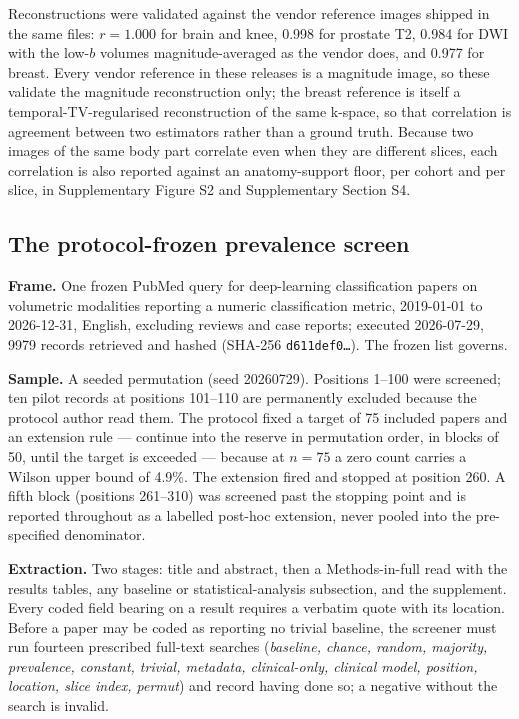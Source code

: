 \documentclass[11pt,a4paper]{article}
\begin{document}
Reconstructions were validated against the
vendor reference images shipped in the same files: $r=1.000$ for brain and knee,
0.998 for prostate T2, 0.984 for DWI with the low-$b$ volumes magnitude-averaged
as the vendor does, and 0.977 for breast. Every vendor reference in these
releases is a magnitude image, so these validate the magnitude reconstruction
only; the breast reference is itself a temporal-TV-regularised reconstruction of
the same k-space, so that correlation is agreement between two estimators rather
than a ground truth. Because two images of the same body part correlate even when
they are different slices, each correlation is also reported against an
anatomy-support floor, per cohort and per slice, in Supplementary Figure S2 and
Supplementary Section S4.

\subsection{The protocol-frozen prevalence screen}

\textbf{Frame.} One frozen PubMed query for deep-learning classification papers
on volumetric modalities reporting a numeric classification metric, 2019-01-01 to
2026-12-31, English, excluding reviews and case reports; executed 2026-07-29,
\num{9979} records retrieved and hashed (SHA-256 \texttt{d611def0\ldots}). The
frozen list governs.

\textbf{Sample.} A seeded permutation (seed 20260729). Positions 1--100 were
screened; ten pilot records at positions 101--110 are permanently excluded
because the protocol author read them. The protocol fixed a target of 75 included
papers and an extension rule --- continue into the reserve in permutation order,
in blocks of 50, until the target is exceeded --- because at $n=75$ a zero count
carries a Wilson upper bound of 4.9\%. The extension fired and stopped at
position 260. A fifth block (positions 261--310) was screened past the stopping
point and is reported throughout as a labelled post-hoc extension, never pooled
into the pre-specified denominator.

\textbf{Extraction.} Two stages: title and abstract, then a Methods-in-full read
with the results tables, any baseline or statistical-analysis subsection, and the
supplement. Every coded field bearing on a result requires a verbatim quote with
its location. Before a paper may be coded as reporting no trivial baseline, the
screener must run fourteen prescribed full-text searches (\emph{baseline, chance,
random, majority, prevalence, constant, trivial, metadata, clinical-only,
clinical model, position, location, slice index, permut}) and record having done
so; a negative without the search is invalid.
\end{document}
